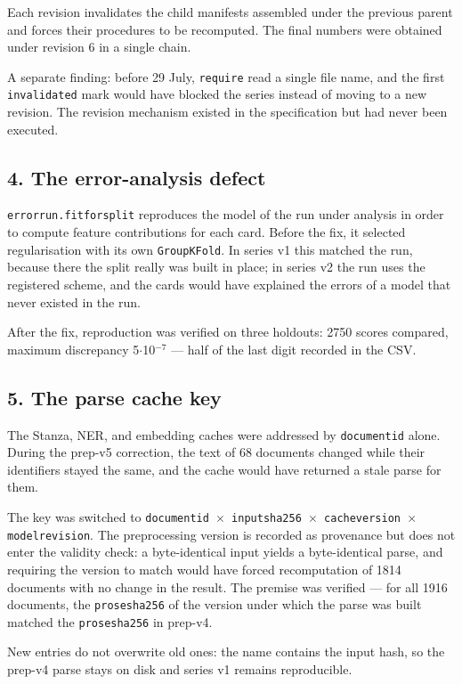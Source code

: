 \documentclass[11pt,a4paper]{article}
\renewcommand{\_}{\textunderscore\allowbreak}
\begin{document}
Each revision invalidates the child manifests assembled under the previous parent and forces their procedures to be recomputed. The final numbers were obtained under revision 6 in a single chain.

A separate finding: before 29 July, \texttt{require} read a single file name, and the first \texttt{invalidated} mark would have blocked the series instead of moving to a new revision. The revision mechanism existed in the specification but had never been executed.

\subsection{4. The error-analysis defect}

\texttt{error\_run.fit\_for\_split} reproduces the model of the run under analysis in order to compute feature contributions for each card. Before the fix, it selected regularisation with its own \texttt{GroupKFold}. In series v1 this matched the run, because there the split really was built in place; in series v2 the run uses the registered scheme, and the cards would have explained the errors of a model that never existed in the run.

After the fix, reproduction was verified on three holdouts: 2750 scores compared, maximum discrepancy 5$\cdot$10$^{-7}$ — half of the last digit recorded in the CSV.

\subsection{5. The parse cache key}

The Stanza, NER, and embedding caches were addressed by \texttt{document\_id} alone. During the prep-v5 correction, the text of 68 documents changed while their identifiers stayed the same, and the cache would have returned a stale parse for them.

The key was switched to \texttt{document\_id $\times$ input\_sha256 $\times$ cache\_version $\times$ model\_revision}. The preprocessing version is recorded as provenance but does not enter the validity check: a byte-identical input yields a byte-identical parse, and requiring the version to match would have forced recomputation of 1814 documents with no change in the result. The premise was verified — for all 1916 documents, the \texttt{prose\_sha256} of the version under which the parse was built matched the \texttt{prose\_sha256} in prep-v4.

New entries do not overwrite old ones: the name contains the input hash, so the prep-v4 parse stays on disk and series v1 remains reproducible.
\end{document}
